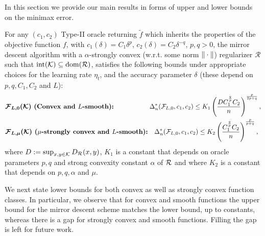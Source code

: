 
In this section we provide our main results in forms of upper and lower bounds on the minimax error.
\begin{theorem}
\label{thm:ub}
For any $(c_1,c_2)$ Type-II oracle returning $\tilde{f}$ which inherits the properties of the objective function $f$,
 with $c_1(\delta) = C_1 \delta^p$, $c_2(\delta) = C_2 \delta^{-q}$, $p,q>0$,
the mirror descent algorithm \citep{NeYu83}
with a $\alpha$-strongly convex (w.r.t. some norm $\|\cdot\|$) regularizer $\mathcal{R}$ such that $\operatorname{int}(\mathcal{K})\subseteq \operatorname{dom}(\mathcal{R})$,
satisfies the following bounds under appropriate choices for the learning rate $\eta_t$, and the accuracy parameter $\delta$ (these depend on $p, q, C_1, C_2$ and $L$):
\vspace*{-0.3in}
\begin{align*}
&\textbf{$\bm{\mathcal{F}_{L,0}(\mathcal{K})}$ (Convex and $L$-smooth):} \hspace{5.5em} \Delta_n^{*}(\mathcal{F}_{L,0}, c_1,c_2) \le K_1\left(\dfrac{D {C_1^{\frac{q}{p}} C_2}}{ n}\right)^{\frac{p}{2p+q}},\\
&\textbf{$\bm{\mathcal{F}_{L,\mu}(\mathcal{K})}$ ($\mu$-strongly convex and $L$-smooth):} \hspace{1em}
\Delta_n^{*}(\mathcal{F}_{L,0}, c_1,c_2) \le K_2\left(\dfrac{C_1^{\frac{q}{p}} C_2}{ n}\right)^{\frac{p}{p+q}},
\end{align*}
where $D:=\sup_{x,y\in \mathcal{K}} D_{\mathcal{R}}(x,y)$, $K_1$ is a constant that depends on oracle parameters $p, q$ and strong convexity constant $\alpha$ of $\cal R$ and
where $K_2$ is a constant that depends on $p, q, \alpha$ and $\mu$.
\end{theorem}
We next state lower bounds for both convex as well as strongly convex function classes. In particular, we observe that for convex and smooth functions the upper bound for the mirror descent scheme matches the lower bound, up to constants, whereas there is a gap for strongly convex and smooth functions.
Filling the gap is left for future work.
